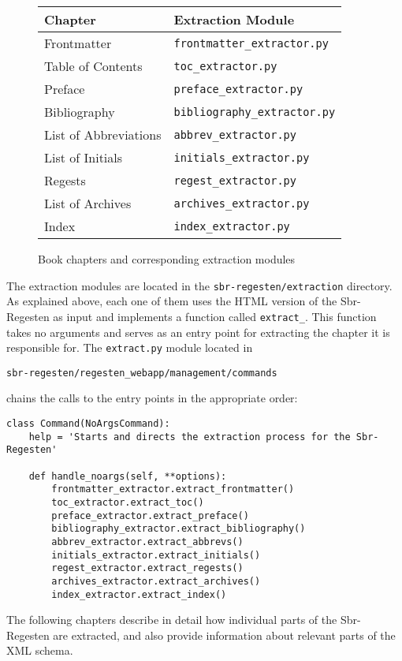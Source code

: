 \begin{figure}[h]
  \centering
  \begin{tabular}{l|l}
    \hline
    Chapter & Extraction Module \\
    \hline
    Frontmatter & \texttt{frontmatter\_extractor.py} \\
    Table of Contents & \texttt{toc\_extractor.py} \\
    Preface & \texttt{preface\_extractor.py} \\
    Bibliography & \texttt{bibliography\_extractor.py} \\
    List of Abbreviations & \texttt{abbrev\_extractor.py} \\
    List of Initials & \texttt{initials\_extractor.py} \\
    Regests & \texttt{regest\_extractor.py} \\
    List of Archives & \texttt{archives\_extractor.py} \\
    Index & \texttt{index\_extractor.py} \\
    \hline
  \end{tabular}
  \caption{Book chapters and corresponding extraction modules}
  \label{fig:extraction-modules}
\end{figure}

The extraction modules are located in the
\texttt{sbr-regesten/extraction} directory. As explained above, each
one of them uses the HTML version of the Sbr-Regesten as input and
implements a function called \texttt{extract\_<part-of-book>}. This
function takes no arguments and serves as an entry point for
extracting the chapter it is responsible for. The \texttt{extract.py}
module located in

\begin{verbatim}
sbr-regesten/regesten_webapp/management/commands
\end{verbatim}

chains the calls to the entry points in the appropriate order:

\begin{verbatim}
class Command(NoArgsCommand):
    help = 'Starts and directs the extraction process for the Sbr-Regesten'

    def handle_noargs(self, **options):
        frontmatter_extractor.extract_frontmatter()
        toc_extractor.extract_toc()
        preface_extractor.extract_preface()
        bibliography_extractor.extract_bibliography()
        abbrev_extractor.extract_abbrevs()
        initials_extractor.extract_initials()
        regest_extractor.extract_regests()
        archives_extractor.extract_archives()
        index_extractor.extract_index()
\end{verbatim}

The following chapters describe in detail how individual parts of the
Sbr-Regesten are extracted, and also provide information about
relevant parts of the XML schema.
